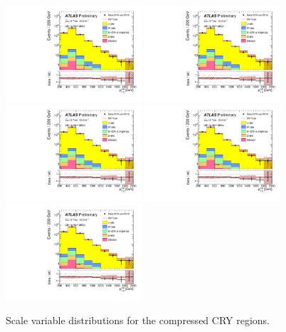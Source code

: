 \begin{figure}[tbp]
\begin{center}
\includegraphics[width=0.45\textwidth]{figures/ATLAS-CONF-2016-078_INT/N-1Plots/AtlasStyle/Preliminary/CRY_SRJigsawSRC1_LastCut_CRY_minusone}
\includegraphics[width=0.45\textwidth]{figures/ATLAS-CONF-2016-078_INT/N-1Plots/AtlasStyle/Preliminary/CRY_SRJigsawSRC2_LastCut_CRY_minusone}
\includegraphics[width=0.45\textwidth]{figures/ATLAS-CONF-2016-078_INT/N-1Plots/AtlasStyle/Preliminary/CRY_SRJigsawSRC3_LastCut_CRY_minusone}
\includegraphics[width=0.45\textwidth]{figures/ATLAS-CONF-2016-078_INT/N-1Plots/AtlasStyle/Preliminary/CRY_SRJigsawSRC4_LastCut_CRY_minusone}
\includegraphics[width=0.45\textwidth]{figures/ATLAS-CONF-2016-078_INT/N-1Plots/AtlasStyle/Preliminary/CRY_SRJigsawSRC5_LastCut_CRY_minusone}
\end{center}
\caption{Scale variable distributions for the compressed CRY regions.}
\label{fig:CRY_SRJigsawSRC1_LastCut_CRY_minusone}
\end{figure}

